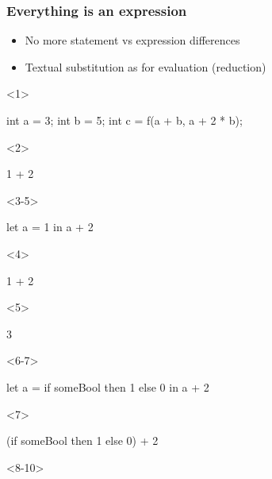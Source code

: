 \documentclass[17pt]{beamer}
\renewcommand{\(}[1]{\begin{columns}[#1]}
\renewcommand{\)}{\end{columns}}
\newcommand{\<}[1]{\begin{column}{#1}}
\renewcommand{\>}{\end{column}}
\begin{document}
\begin{frame}[fragile]
  \frametitle{Everything is an expression}
  \begin{minipage}[t][.2\textheight]{\textwidth}
  \begin{itemize}
    \item No more statement vs expression differences
    \item<4-> Textual substitution as  for evaluation (reduction)
  \end{itemize}
  \end{minipage}
  \begin{minipage}[c][.5\textheight]{\textwidth}
  \begin{center}
    \begin{onlyenv}<1>
      \begin{ccode}
int a = 3;
int b = 5;
int c = f(a + b, a + 2 * b);
      \end{ccode}
    \end{onlyenv}
    \begin{onlyenv}<2>
      \begin{code}
1 + 2
      \end{code}
    \end{onlyenv}
    \begin{onlyenv}<3-5>
      \begin{code}
let a = 1
in  a + 2
      \end{code}
    \end{onlyenv}
    \begin{onlyenv}<4>
      \begin{code}[eval]
1 + 2
      \end{code}
    \end{onlyenv}
    \begin{onlyenv}<5>
      \begin{code}[eval]
3
      \end{code}
    \end{onlyenv}
    \begin{onlyenv}<6-7>
      \begin{code}
let a = if someBool then 1 else 0
in  a + 2
      \end{code}
    \end{onlyenv}
    \begin{onlyenv}<7>
      \begin{code}[eval]
(if someBool then 1 else 0) + 2
      \end{code}
    \end{onlyenv}
    \begin{onlyenv}<8-10>

\end{onlyenv}
\end{center}
\end{minipage}
\end{frame}
\end{document}
